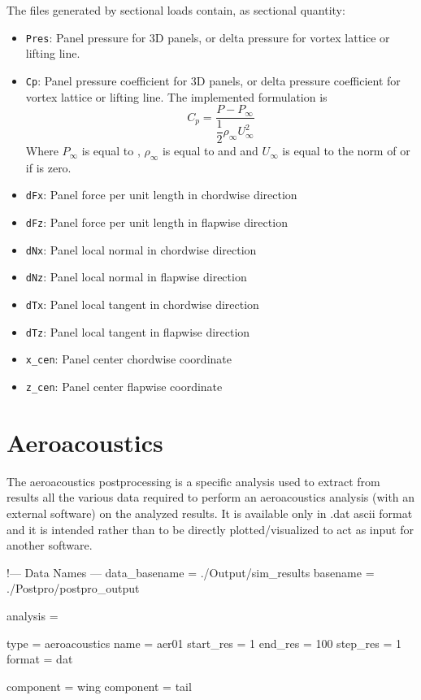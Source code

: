 The files generated by sectional loads contain, as sectional quantity:
\begin{itemize}
  \item \texttt{Pres}: Panel pressure for 3D panels, or delta pressure for vortex lattice or 
                      lifting  line. 
  \item \texttt{Cp}: Panel pressure coefficient for 3D panels, or delta pressure 
                    coefficient for vortex lattice or lifting line. The implemented formulation is 
                    \begin{equation}
                      C_p = \dfrac{P - P_\infty}{\dfrac{1}{2} \rho_\infty U_\infty^2}
                    \end{equation}
                    Where $P_\infty$ is equal to , $\rho_\infty$ is equal to  and 
                    and $U_\infty$ is equal to the norm of  or  if  is zero. 
  \item \texttt{dFx}: Panel force per unit length in chordwise direction
  \item \texttt{dFz}: Panel force per unit length in flapwise direction
  \item \texttt{dNx}: Panel local normal in chordwise direction
  \item \texttt{dNz}: Panel local normal in flapwise direction
  \item \texttt{dTx}: Panel local tangent in chordwise direction
  \item \texttt{dTz}: Panel local tangent in flapwise direction
  \item \texttt{x\_cen}: Panel center chordwise coordinate
  \item \texttt{z\_cen}: Panel center flapwise coordinate
\end{itemize}


\section{Aeroacoustics}
The aeroacoustics postprocessing is a specific analysis used to 
extract from results all the various data required to perform an 
aeroacoustics analysis (with an external software) on the analyzed results. 
It is available only in .dat ascii format  and it is intended rather than 
to be directly plotted/visualized to act as input for another software.

\begin{inputfile}[frame=single, caption={dust\_post.in for aeroacoustics}, 
  label={file:dust_post.in_aeroacoustics}]
!--- Data Names ---
data_basename = ./Output/sim_results
basename =     ./Postpro/postpro_output

analysis = {

type = aeroacoustics
name = aer01
start_res = 1
end_res   = 100 
step_res  = 1
format = dat

component = wing
component = tail

}
\end{inputfile}

